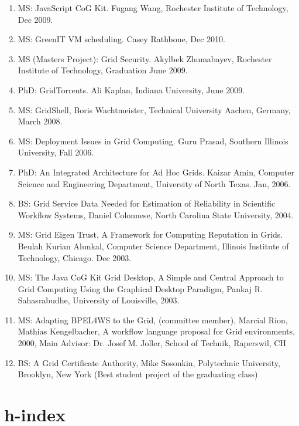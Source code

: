 \documentclass{article}
\begin{document}
\begin{enumerate}
\item  MS: JavaScript CoG Kit. Fugang Wang, Rochester Institute of Technology, Dec 2009. 
\item  MS: GreenIT VM scheduling. Casey Rathbone, Dec 2010.
\item  MS (Masters Project): Grid Security. Akylbek Zhumabayev, Rochester Institute of Technology, Graduation June 2009. 
\item  PhD: GridTorrents. Ali Kaplan, Indiana University, June 2009.
\item  MS: GridShell, Boris Wachtmeister, Technical University Aachen, Germany, March 2008.
\item  MS: Deployment Issues in Grid Computing. Guru Prasad, Southern Illinois University, Fall 2006. 
\item  PhD: An Integrated Architecture for Ad Hoc Grids. Kaizar Amin, Computer Science and Engineering Department, University of North Texas. Jan, 2006.
\item  BS: Grid Service Data Needed for Estimation of Reliability in Scientific Workflow Systems, Daniel Colonnese, North Carolina State University, 2004. 
\item  MS: Grid Eigen Trust, A Framework for Computing Reputation in Grids. Beulah Kurian Alunkal, Computer Science Department, Illinois Institute of Technology, Chicago. Dec 2003. 
\item  MS: The Java CoG Kit Grid Desktop, A Simple and Central Approach to Grid Computing Using the Graphical Desktop Paradigm, Pankaj R. Sahasrabudhe, University of Louisville, 2003.
\item  MS: Adapting BPEL4WS to the Grid, (committee member), Marcial Rion, Mathias Kengelbacher, A workflow language proposal for Grid environments, 2000, Main Advisor: Dr. Josef M. Joller, School of Technik, Raperswil, CH 
\item  BS: A Grid Certificate Authority, Mike Sosonkin, Polytechnic University, Brooklyn, New York (Best student project of the graduating class)
\end{enumerate}




\section{h-index}
\end{document}
